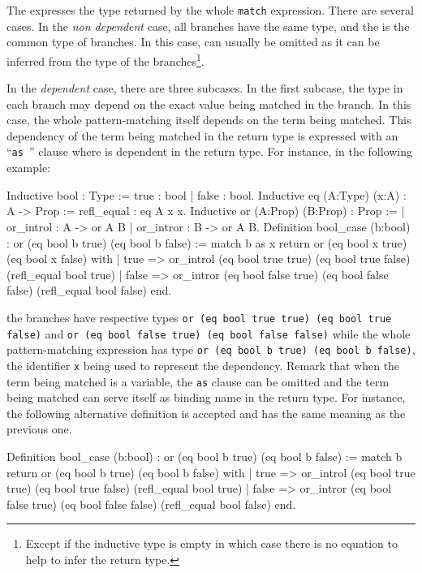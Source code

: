 The {\returntype} expresses the type returned by the whole {\tt match}
expression. There are several cases.  In the {\em non dependent} case,
all branches have the same type, and the {\returntype} is the common
type of branches. In this case, {\returntype} can usually be omitted
as it can be inferred from the type of the branches\footnote{Except if
the inductive type is empty in which case there is no equation to help
to infer the return type.}.

In the {\em dependent} case, there are three subcases. In the first
subcase, the type in each branch may depend on the exact value being
matched in the branch. In this case, the whole pattern-matching itself
depends on the term being matched. This dependency of the term being
matched in the return type is expressed with an ``{\tt as {\ident}}''
clause where {\ident} is dependent in the return type.
For instance, in the following example:
\begin{coq_example*}
Inductive bool : Type := true : bool | false : bool.
Inductive eq (A:Type) (x:A) : A -> Prop := refl_equal : eq A x x.
Inductive or (A:Prop) (B:Prop) : Prop :=
| or_introl : A -> or A B
| or_intror : B -> or A B.
Definition bool_case (b:bool) : or (eq bool b true) (eq bool b false)
:= match b as x return or (eq bool x true) (eq bool x false) with
   | true  => or_introl (eq bool true true) (eq bool true false)
                (refl_equal bool true)
   | false => or_intror (eq bool false true) (eq bool false false)
                (refl_equal bool false)
   end.
\end{coq_example*}
the branches have respective types {\tt or (eq bool true true) (eq
bool true false)} and {\tt or (eq bool false true) (eq bool false
false)} while the whole pattern-matching expression has type {\tt or
(eq bool b true) (eq bool b false)}, the identifier {\tt x} being used
to represent the dependency.  Remark that when the term being matched
is a variable, the {\tt as} clause can be omitted and the term being
matched can serve itself as binding name in the return type. For
instance, the following alternative definition is accepted and has the
same meaning as the previous one.
\begin{coq_example*}
Definition bool_case (b:bool) : or (eq bool b true) (eq bool b false)
:= match b return or (eq bool b true) (eq bool b false) with
   | true  => or_introl (eq bool true true) (eq bool true false)
                (refl_equal bool true)
   | false => or_intror (eq bool false true) (eq bool false false)
                (refl_equal bool false)
   end.
\end{coq_example*}

